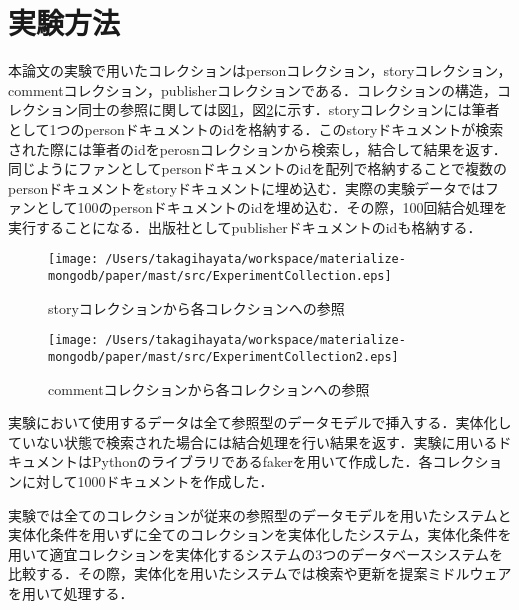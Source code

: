 \documentclass[a4paper,11pt]{ujreport}
\begin{document}
\section{実験方法}
本論文の実験で用いたコレクションはpersonコレクション，storyコレクション，commentコレクション，publisherコレクションである．コレクションの構造，コレクション同士の参照に関しては図\ref{ExperimentCollection}，図\ref{ExperimentCollection2}に示す．storyコレクションには筆者として1つのpersonドキュメントのidを格納する．このstoryドキュメントが検索された際には筆者のidをperosnコレクションから検索し，結合して結果を返す．同じようにファンとしてpersonドキュメントのidを配列で格納することで複数のpersonドキュメントをstoryドキュメントに埋め込む．実際の実験データではファンとして100のpersonドキュメントのidを埋め込む．その際，100回結合処理を実行することになる．出版社としてpublisherドキュメントのidも格納する．
\begin{figure}[htbp]
	\begin{center}
		\texttt{[image: /Users/takagihayata/workspace/materialize-mongodb/paper/mast/src/ExperimentCollection.eps]} %
	\end{center}
	\caption{storyコレクションから各コレクションへの参照}
	\label{ExperimentCollection}
\end{figure}
\begin{figure}[htbp]
	\begin{center}
		\texttt{[image: /Users/takagihayata/workspace/materialize-mongodb/paper/mast/src/ExperimentCollection2.eps]} %
	\end{center}
	\caption{commentコレクションから各コレクションへの参照}
	\label{ExperimentCollection2}
\end{figure}
実験において使用するデータは全て参照型のデータモデルで挿入する．実体化していない状態で検索された場合には結合処理を行い結果を返す．実験に用いるドキュメントはPythonのライブラリであるfaker\cite{faker}を用いて作成した．各コレクションに対して1000ドキュメントを作成した．


実験では全てのコレクションが従来の参照型のデータモデルを用いたシステムと実体化条件を用いずに全てのコレクションを実体化したシステム，実体化条件を用いて適宜コレクションを実体化するシステムの3つのデータベースシステムを比較する．その際，実体化を用いたシステムでは検索や更新を提案ミドルウェアを用いて処理する．
\end{document}
